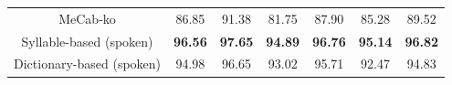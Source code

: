 \documentclass[AMS,STIX2COL]{WileyNJD-v2}
\begin{document}
\begin{table}[h]
\begin{tabular*}{500pt}{@{\extracolsep\fill}c|cccccc@{\extracolsep\fill}}
            \midrule
            \hspace{2mm}MeCab-ko                   & 86.85                      & 91.38                        & 81.75                      & 87.90                        & 85.28                      & 89.52                        \\
            \hspace{2mm}Syllable-based (spoken)    & \textbf{96.56}             & \textbf{97.65}               & \textbf{94.89}             & \textbf{96.76}               & \textbf{95.14}             & \textbf{96.82}               \\
            \hspace{2mm}Dictionary-based (spoken)  & 94.98                      & 96.65                        & 93.02                      & 95.71                        & 92.47                      & 94.83                        \\
            \bottomrule
        \end{tabular*}
    \end{table}
\end{document}
